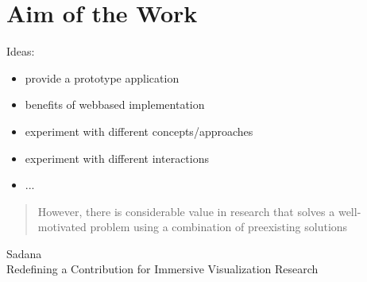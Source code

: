 \section{Aim of the Work}

Ideas:
\begin{itemize}
    \item provide a prototype application
    \item benefits of webbased implementation 
    \item experiment with different concepts/approaches
    \item experiment with different interactions
    \item ...
\end{itemize}

\begin{quotation}
    However, there is considerable value in research that
    solves a well-motivated problem using a combination
    of preexisting solutions 
\end{quotation}
Sadana\\
Redefining a Contribution for Immersive Visualization Research\\